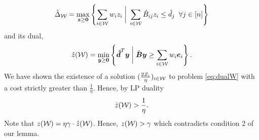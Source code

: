 \documentclass[moor]{informs1}              %
\newcommand{\mb}[1]{\ensuremath{\boldsymbol{#1}}}
\begin{document}
\begin{equation}\label{eq:dualW}
\hat{\Delta}_{\cal W}= \max_{\mb z \geq \mb 0}  \left\{ \sum_{ i \in {\cal W}} w_i z_i \; \bigg\vert \;   \sum_{ i \in {\cal W}} \hat{B}_{ij} z_i \leq \hat{d}_j \; \; \forall j \in [n]   \right\}
\end{equation}
and its dual,
\begin{equation}\label{eq:prob}
 \hat z({\cal W})  = \min_{\mb y \geq \mb 0} \left\{ \mb{\hat{d}}^T \mb y \; \bigg\vert \; \hat{\mb B} \mb y \geq \sum_{ i \in {\cal W}} w_i \mb e_i \right\}.
\end{equation}
 We have shown the existence of a  solution $(\frac{2Z_i}{\eta})_{i\in {\cal W}}$ to problem \eqref{eq:dualW} with a cost strictly greater than $\frac{1}{\eta}$. Hence, by LP duality 
$$  \hat z({\cal W})  >\frac{1}{\eta}.$$ 
Note that $  z({\cal W})  =  \eta \gamma\cdot \hat z({\cal W}) $. Hence, $    z({\cal W})  >  \gamma$ which contradicts  condition 2 of our lemma.







 
\end{document}
